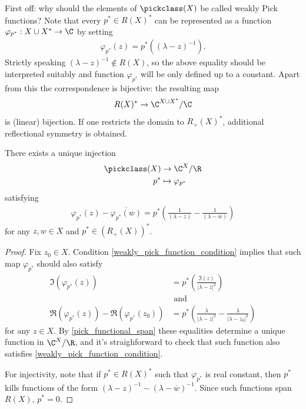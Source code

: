 First off: why should the elements of $\pickclass(X)$ be called weakly Pick functions? Note that every $p^{*} \in R(X)^{*}$ can be represented as a function $\varphi_{p^{*}} : X \cup X^{*} \to \C$ by setting
\begin{align*}
	\varphi_{p^{*}}(z) = p^{*}((\lambda - z)^{-1}).
\end{align*}
Strictly speaking $(\lambda - z)^{-1} \notin R(X)$, so the above equality should be interpreted suitably and function $\varphi_{p^{*}}$ will be only defined up to a constant. Apart from this the correspondence is bijective: the resulting map
\begin{align*}
	R(X)^{*} \to \C^{X \cup X^{*}}/\C
\end{align*}
is (linear) bijection. If one restricts the domain to $R_{+}(X)^{*}$, additional reflectional symmetry is obtained.
\begin{lem}\label{weakly_pick_nonsense}
	There exists a unique injection
	\begin{align*}
		\pickclass(X) &\to \C^{X}/\R \\
		p^{*} &\mapsto \varphi_{p^{*}}
	\end{align*}
	satisfying
	\begin{align}\label{weakly_pick_function_condition}
		\varphi_{p^{*}}(z) - \overline{\varphi_{p^{*}}(w)} = p^{*}\left(\frac{1}{(\lambda - z)} -\frac{1}{(\lambda - \overline{w})}\right)
	\end{align}
	for any $z, w \in X$ and $p^{*} \in (R_{+}(X))^{*}$.
\end{lem}
\begin{proof}
	Fix $z_{0} \in X$. Condition \ref{weakly_pick_function_condition} implies that such map $\varphi_{p^{*}}$ should also satisfy
	\begin{align}\label{weakly_pick_condition_2}
		\Im(\varphi_{p^{*}}(z)) &= p^{*}\left(\frac{\Im(z)}{|\lambda - z|^{2}}\right) \nonumber\\
		&\text{ and } \\
		\Re(\varphi_{p^{*}}(z)) - \Re(\varphi_{p^{*}}(z_{0})) &= p^{*}\left(\frac{\lambda}{|\lambda - z|^2} - \frac{\lambda}{|\lambda - z_{0}|^2}\right) \nonumber
	\end{align}
	for any $z \in X$. By \ref{pick_functional_span} these equalities determine a unique function in $\C^{X}/\R$, and it's straighforward to check that such function also satisfies \ref{weakly_pick_function_condition}.

	For injectivity, note that if $p^{*} \in R(X)^{*}$ such that $\varphi_{p^{*}}$ is real constant, then $p^{*}$ kills functions of the form $(\lambda - z)^{-1} -(\lambda - \overline{w})^{-1}$. Since such functions span $R(X)$, $p^{*} = 0$. 
\end{proof}

